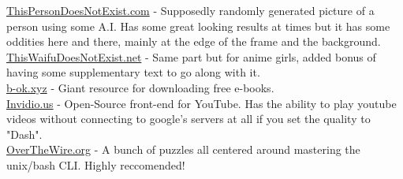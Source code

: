 \documentclass{article}
\begin{document}
\href{https://thispersondoesnotexist.com/}{ThisPersonDoesNotExist.com} - Supposedly randomly generated picture of a person using some A.I. Has some great looking results at times but it has some oddities here and there, mainly at the edge of the frame and the background.\\
\href{https://www.thiswaifudoesnotexist.net/}{ThisWaifuDoesNotExist.net} - Same part but for anime girls, added bonus of having some supplementary text to go along with it.\\
\href{https://b-ok.xyz/}{b-ok.xyz} - Giant resource for downloading free e-books.\\
\href{https://invidio.us/}{Invidio.us} - Open-Source front-end for YouTube. Has the ability to play youtube videos without connecting to google's servers at all if you set the quality to "Dash".\\
\href{http://overthewire.org/}{OverTheWire.org} - A bunch of puzzles all centered around mastering the unix/bash CLI. Highly reccomended! 
\end{document}
